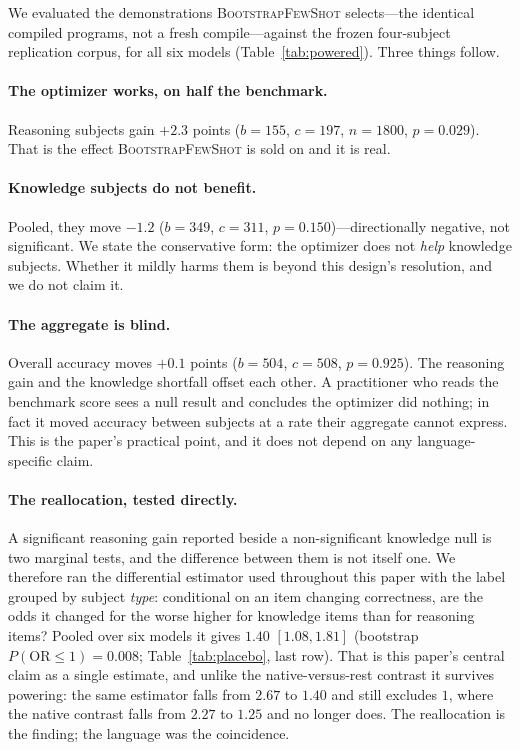 \documentclass[11pt]{article}
\newcommand{\bsfs}{\textsc{BootstrapFewShot}}
\begin{document}
We evaluated the demonstrations \bsfs{} selects---the identical compiled programs, not a
fresh compile---against the frozen four-subject replication corpus, for all six models
(Table~\ref{tab:powered}). Three things follow.

\paragraph{The optimizer works, on half the benchmark.} Reasoning subjects gain $+2.3$
points ($b{=}155$, $c{=}197$, $n{=}1800$, $p{=}0.029$). That is the effect \bsfs{} is
sold on and it is real.

\paragraph{Knowledge subjects do not benefit.} Pooled, they move $-1.2$ ($b{=}349$,
$c{=}311$, $p{=}0.150$)---directionally negative, not significant. We state the
conservative form: the optimizer does not \emph{help} knowledge subjects. Whether it
mildly harms them is beyond this design's resolution, and we do not claim it.

\paragraph{The aggregate is blind.} Overall accuracy moves $+0.1$ points
($b{=}504$, $c{=}508$, $p{=}0.925$). The reasoning gain and the knowledge shortfall
offset each other. A practitioner who reads the benchmark score sees a null result
and concludes the optimizer did nothing; in fact it moved accuracy between subjects at a
rate their aggregate cannot express. This is the paper's practical point, and it does
not depend on any language-specific claim.

\paragraph{The reallocation, tested directly.} A significant reasoning gain reported
beside a non-significant knowledge null is two marginal tests, and the difference between
them is not itself one. We therefore ran the differential estimator used throughout this
paper with the label grouped by subject \emph{type}: conditional on an item changing
correctness, are the odds it changed for the worse higher for knowledge items than for
reasoning items? Pooled over six models it gives $1.40$ $[1.08, 1.81]$ (bootstrap
$P(\mathrm{OR}{\le}1){=}0.008$; Table~\ref{tab:placebo}, last row). That is this paper's
central claim as a single estimate, and unlike the native-versus-rest contrast it
survives powering: the same estimator falls from $2.67$ to $1.40$ and still excludes $1$,
where the native contrast falls from $2.27$ to $1.25$ and no longer does. The
reallocation is the finding; the language was the coincidence.
\end{document}
